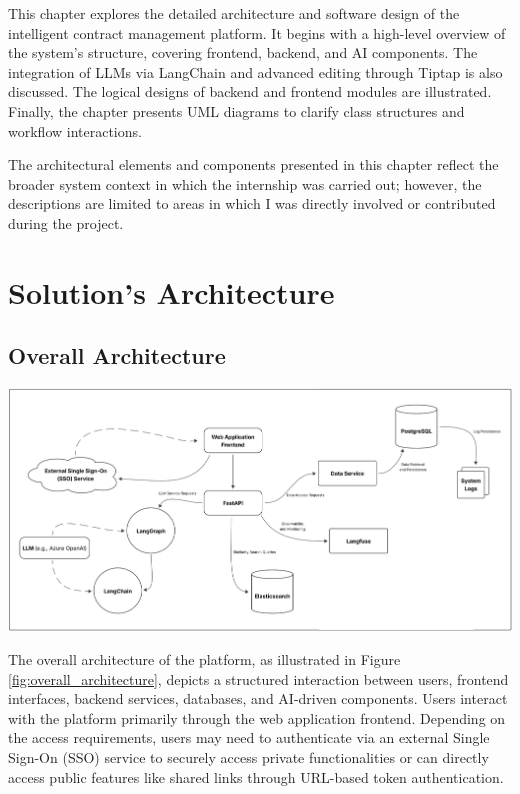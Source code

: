 This chapter explores the detailed architecture and software design of the intelligent contract management platform. It begins with a high-level overview of the system’s structure, covering frontend, backend, and AI components. The integration of LLMs via LangChain and advanced editing through Tiptap is also discussed. The logical designs of backend and frontend modules are illustrated. Finally, the chapter presents UML diagrams to clarify class structures and workflow interactions.\mynewline

The architectural elements and components presented in this chapter reflect the broader system context in which the internship was carried out; however, the descriptions are limited to areas in which I was directly involved or contributed during the project.

\newpage
{}
\hypertarget{thirdchapter}{}

\section{Solution's Architecture}

\subsection{Overall Architecture}
\begin{center}
    \centering
    \includegraphics[width=1\textwidth]{Images/Global Architecture of the Platform.png}
    \label{fig:overall_architecture}
\end{center}

The overall architecture of the platform, as illustrated in Figure \ref{fig:overall_architecture}, depicts a structured interaction between users, frontend interfaces, backend services, databases, and AI-driven components. Users interact with the platform primarily through the web application frontend. Depending on the access requirements, users may need to authenticate via an external Single Sign-On (SSO) service to securely access private functionalities or can directly access public features like shared links through URL-based token authentication.\mynewline

